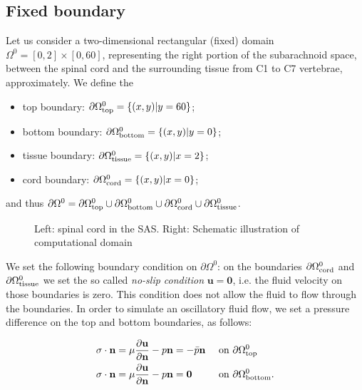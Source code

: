 \documentclass[a4paper,11pt,openright,twoside]{book}
\begin{document}
\subsection{Fixed boundary}
Let us consider a two-dimensional rectangular (fixed) domain $\Omega^0 = [0, 2]
\times [0, 60]$, representing the right portion of the subarachnoid space, between the spinal cord and the surrounding tissue from C1 to C7 vertebrae, approximately. We define the
\begin{itemize}
\item
  top boundary: $\partial \Omega_{\rm top}^0 = \{ (x, y) | y = 60\}$;
\item
  bottom boundary: $\partial \Omega_{\rm bottom}^0 = \{ (x, y) | y = 0\}$;
\item
  tissue boundary: $\partial \Omega_{\rm tissue}^0 = \{ (x, y) | x = 2\}$;
\item
  cord boundary: $\partial \Omega_{\rm cord}^0 = \{ (x, y) | x = 0\}$;
\end{itemize}
and thus $\partial \Omega^0 = \partial \Omega_{\rm top}^0 \cup
\partial \Omega_{\rm bottom}^0 \cup \partial \Omega_{\rm cord}^0 \cup
\partial \Omega_{\rm tissue}^0$.

\begin{figure}


  \caption{Left: spinal cord in the SAS. Right: Schematic illustration
    of computational domain}
\end{figure}

We set the following boundary condition on $\partial \Omega^0$: on the boundaries $\partial \Omega_{\rm cord}^0$ and $\partial \Omega_{\rm tissue}^0$ we set the so called \emph{no-slip condition} $\mathbf{u = 0}$, i.e. the fluid velocity on those boundaries is zero. This condition does not allow the fluid to flow through the boundaries.
In order to simulate an oscillatory fluid flow, we set a pressure difference on the top and bottom boundaries, as follows:

\begin{align}
\label{eq:bc:6}
\sigma \cdot \mathbf{n} &= \mu \frac{\partial \mathbf{u}}{\partial \mathbf{n}} - p \mathbf{n} = -\bar{p} \mathbf{n} && \text { on } \partial \Omega_{\rm top}^0 \\
\label{eq:bc:6bis}
\sigma \cdot \mathbf{n} &= \mu \frac{\partial \mathbf{u}}{\partial \mathbf{n}} - p \mathbf{n} = \mathbf{0}  && \text { on } \partial \Omega_{\rm bottom}^0.
\end{align}
\end{document}

